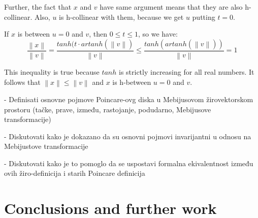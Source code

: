 \documentclass[a4paper]{article}
\theoremstyle{definition}
\newcommand{\norm}[1]{\left\lVert#1\right\rVert}
\begin{document}
Further, the fact that $x$ and $v$ have same argument means that they are also h-collinear. Also, $u$ is h-collinear with them, because we get $u$ putting $t=0$.

If $x$ is between $u=0$ and $v$, then $0\leq t \leq 1$, so we have:
$$\frac{\norm{x}}{\norm{v}} = \frac{tanh(t\cdot artanh(\norm{v})}{\norm{v}}\leq \frac{tanh(artanh(\norm{v}))}{\norm{v}}=1$$

This inequality is true because $tanh$ is strictly increasing for all real numbers. It follows that $\norm{x} \leq \norm{v}$ and $x$ is h-between $u=0$ and $v$.


- Definisati osnovne pojmove Poincare-ovg diska u Mebijusovom žirovektorskom prostoru (tačke, prave, između, rastojanje, podudarno, Mebijusove transformacije)

- Diskutovati kako je dokazano da su osnovni pojmovi invarijantni u odnosu na Mebijustove transformacije

- Diskutovati kako je to pomoglo da se uspostavi formalna ekivalentnost između ovih žiro-definicija i starih Poincare definicija

\section{Conclusions and further work}\label{sec:conclusions}


\end{document}
